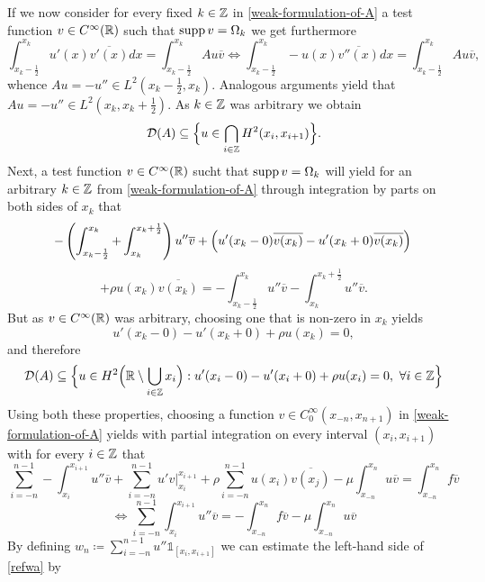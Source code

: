 If we now consider for every fixed $k \in \mathbb{Z}$ in \eqref{weak-formulation-of-A} a test function $v \in C^{\infty}(\mathbb{R})$ such that $\operatorname{supp} v = \Omega_{k}$ we get furthermore
	\[ \int_{x_{k}-\frac{1}{2}}^{x_{k}} u'(x) \overline{v'(x)} dx = \int_{x_{k}-\frac{1}{2}}^{x_{k}} A u \overline{v} \iff \int_{x_{k}-\frac{1}{2}}^{x_{k}} - u(x) \overline{v''(x)} dx = \int_{x_{k}-\frac{1}{2}}^{x_{k}} A u \overline{v}, \]
whence $A u = - u'' \in L^{2}(x_{k} -\frac{1}{2}, x_{k})$. Analogous arguments yield that $A u = - u'' \in L^{2}(x_{k}, x_{k} + \frac{1}{2})$. As $k \in \mathbb{Z}$ was arbitrary we obtain
	$$ \mathcal{D}(A) \subseteq \Big\{ u \in \bigcap_{i \in \mathbb{Z}} H^{2}(x_{i}, x_{i+1}) \Big\}. $$
Next, a test function $v \in C^{\infty}(\mathbb{R})$ sucht that $\operatorname{supp} v = \Omega_{k}$ will yield for an arbitrary $k \in \mathbb{Z}$ from \eqref{weak-formulation-of-A}   through integration by parts on both sides of $x_{k}$ that
	\[ -\left( \int_{x_{k}-\frac{1}{2}}^{x_{k}} + \int_{x_{k}}^{x_{k} + \frac{1}{2}}\right) u'' \overline{v} + \left( u'(x_{k}-0) \overline{v(x_{k})} - u'(x_{k} + 0) \overline{v(x_{k})} \right) \\ \]
	\[ +  \rho u(x_{k})\overline{v(x_{k})} = - \int_{x_{k} - \frac{1}{2}}^{x_{k}} u'' \overline{v} - \int_{x_{k}}^{x_{k} + \frac{1}{2}} u'' \overline{v}. \]
But as $v \in C^{\infty}(\mathbb{R})$ was arbitrary, choosing one that is non-zero in $x_{k}$ yields 
	\[ u'(x_{k}-0) - u'(x_{k}+0) + \rho u(x_{k}) = 0, \]
and therefore
	\begin{equation}
		\mathcal{D}(A) \subseteq \Big\{ u \in H^{2}\Big(\mathbb{R} \setminus \bigcup_{i \in \mathbb{Z}} x_{i} \Big) : u'(x_{i} - 0) - u'(x_{i} + 0) + \rho u(x_{i}) = 0 , ~\forall i \in \mathbb{Z} \Big\}
	\end{equation} 
Using both these properties, choosing a function $v \in C_{0}^{\infty}(x_{-n}, x_{n+1})$ in \eqref{weak-formulation-of-A} yields with partial integration on every interval $(x_{i}, x_{i+1})$ with for every $i \in \mathbb{Z}$ that
\[ \sum_{i=-n}^{n-1} -\int_{x_{i}}^{x_{i+1}} u'' \overline{v} + \sum_{i=-n}^{n-1} u' v \Big|_{x_{i}}^{x_{i+1}} + \rho \sum_{i=-n}^{n-1} u(x_{i}) \overline{v(x_{j})} - \mu \int_{x_{-n}}^{x_{n}} u \overline{v} = \int_{x_{-n}}^{x_{n}} f \overline{v} \]
\begin{equation} 
	\iff \sum_{i=-n}^{n-1} \int_{x_{i}}^{x_{i+1}} u'' \overline{v} = - \int_{x_{-n}}^{x_{n}} f \overline{v} - \mu \int_{x_{-n}}^{x_{n}} u \overline{v} \label{refwa}
\end{equation} 
By defining $w_{n} \coloneqq \sum_{i=-n}^{n-1} u'' \mathds{1}_{[x_{i}, x_{i+1}]}$ we can estimate the left-hand side of \eqref{refwa} by
